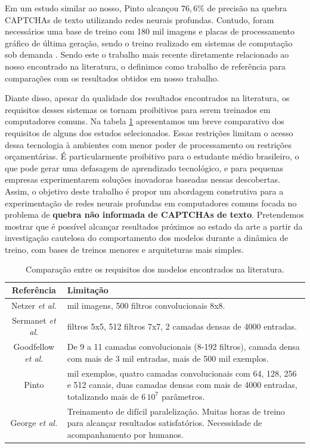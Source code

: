 Em um estudo similar ao nosso, Pinto alcançou $76,6\%$ de precisão na quebra CAPTCHAs de texto utilizando redes neurais profundas. Contudo, foram necessários uma base de treino com 180 mil imagens e placas de processamento gráfico de última geração, sendo o treino realizado em sistemas de computação sob demanda \cite{otaro}. Sendo este o trabalho mais recente diretamente relacionado ao nosso encontrado na literatura, o definimos como trabalho de referência para comparações com os resultados obtidos em nosso trabalho.

Diante disso, apesar da qualidade dos resultados encontrados na literatura, os requisitos desses sistemas os tornam proibitivos para serem treinados em computadores comuns. Na tabela \ref{tableredes} apresentamos um breve comparativo dos requisitos de alguns dos estudos selecionados. Essas restrições limitam o acesso dessa tecnologia à ambientes com menor poder de processamento ou restrições orçamentárias. É particularmente proibitivo para o estudante médio brasileiro, o que pode gerar uma defasagem de aprendizado tecnológico, e para pequenas empresas experimentarem soluções inovadoras baseadas nessas descobertas. Assim, o objetivo deste trabalho é propor um abordagem construtiva para a experimentação de redes neurais profundas em computadores comuns focada no problema de \textbf{quebra não informada de CAPTCHAs de texto}. Pretendemos mostrar que é possível alcançar resultados próximos ao estado da arte a partir da investigação cautelosa do comportamento dos modelos durante a dinâmica de treino, com bases de treinos menores e arquiteturas mais simples. 


\begin{table}[ht]
\begin{center}
	\caption{Comparação entre os requisitos dos modelos encontrados na literatura.}
	\begin{tabular}{ c | >{\centering\arraybackslash}m{7cm}  }
		Referência & Limitação  \\ %
		\hline \hline  
		Netzer \textit{et al.}     \cite{netzer2011reading}         &  600 mil imagens, 500 filtros convolucionais 8x8.  \\ \hline
		Sermanet \textit{et al.}   \cite{sermanet2012convolutional} &  16 filtros 5x5, 512 filtros 7x7, 2 camadas densas de 4000 entradas. \\ \hline
		Goodfellow \textit{et al.} \cite{captcha_break_2013}        &  De 9 a 11 camadas convolucionais (8-192 filtros), camada densa com mais de 3 mil entradas, mais de 500 mil exemplos.   \\ \hline
		Pinto \cite{otaro}											& 180 mil exemplos, quatro camadas convolucionais com 64, 128, 256 e 512 canais, duas camadas densas com mais de 4000 entradas, totalizando mais de $6 \, 10^{7}$ parâmetros.\\ \hline
		George \textit{et al.} \cite{captcha_break_2017}			& Treinamento de difícil paralelização. Muitas horas de treino para alcançar resultados satisfatórios. Necessidade de acompanhamento por humanos.\\ \hline
\end{tabular}
	\label{tableredes}
\end{center}
\end{table}
